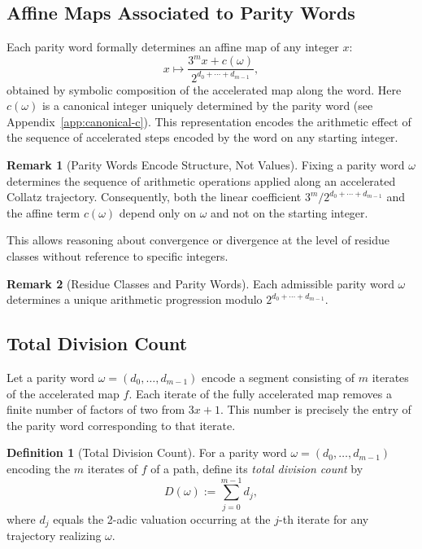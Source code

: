 \documentclass[12pt, oneside]{article}   	%
\numberwithin{equation}{section}          %
\theoremstyle{definition}
\newtheorem{define}{Definition}[section]
\newtheorem*{remark}{Remark}
\begin{document}
\subsection{Affine Maps Associated to Parity Words}
Each parity word formally determines an affine map of any integer $x$:
\begin{equation}
\label{eq:linear-affine-map-m}
x \longmapsto \frac{3^m x + c(\omega)}{2^{d_0+\cdots+d_{m-1}}},
\end{equation}
obtained by symbolic composition of the accelerated map along the word. Here
$c(\omega)$ is a canonical integer uniquely determined by the parity word (see
Appendix~\ref{app:canonical-c}). This representation encodes the arithmetic effect
of the sequence of accelerated steps encoded by the word on any starting integer.

\begin{remark}[Parity Words Encode Structure, Not Values]
Fixing a parity word $\omega$ determines the sequence of arithmetic
operations applied along an accelerated Collatz trajectory. Consequently,
both the linear coefficient $3^m/2^{d_0+\cdots+d_{m-1}}$ and the affine term
$c(\omega)$ depend only on $\omega$ and not on the starting integer.

This allows reasoning about convergence or divergence at the level of
residue classes without reference to specific integers.
\end{remark}

\begin{remark}[Residue Classes and Parity Words]
Each admissible parity word $\omega$ determines a unique arithmetic progression
modulo $2^{d_0+\cdots+d_{m-1}}$.
\end{remark}


\subsection{Total Division Count}

Let a parity word $\omega = (d_0, \dots, d_{m-1})$ encode a segment consisting of $m$
iterates of the accelerated map $f$. Each iterate of the fully accelerated map removes
a finite number of factors of two from $3x+1$. This number is precisely the entry of
the parity word corresponding to that iterate.

\begin{define}[Total Division Count]
For a parity word $\omega = (d_0,\dots,d_{m-1})$ encoding the $m$ iterates of $f$
of a path, define its \emph{total division count} by
\[
D(\omega) := \sum_{j=0}^{m-1} d_j,
\]
where $d_j$ equals the 2-adic valuation occurring at the $j$-th iterate for any
trajectory realizing $\omega$.
\end{define}
\end{document}
